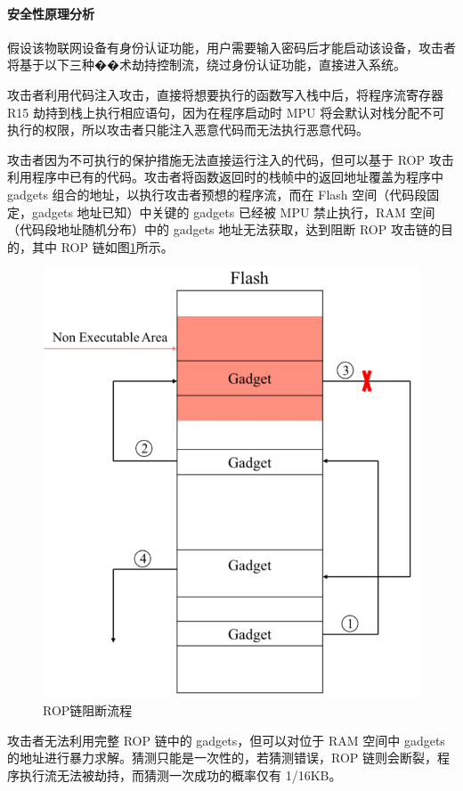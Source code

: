 \documentclass[12pt,a4paper]{ctexart}
\numberwithin{figure}{section}
\begin{document}
\paragraph{安全性原理分析}
\par 假设该物联网设备有身份认证功能，用户需要输入密码后才能启动该设备，攻击者将基于以下三种��术劫持控制流，绕过身份认证功能，直接进入系统。
\par 攻击者利用代码注入攻击，直接将想要执行的函数写入栈中后，将程序流寄存器R15 劫持到栈上执行相应语句，因为在程序启动时 MPU 将会默认对栈分配不可执行的权限，所以攻击者只能注入恶意代码而无法执行恶意代码。
\par 攻击者因为不可执行的保护措施无法直接运行注入的代码，但可以基于 ROP 攻击利用程序中已有的代码。攻击者将函数返回时的栈帧中的返回地址覆盖为程序中gadgets 组合的地址，以执行攻击者预想的程序流，而在 Flash 空间（代码段固定，gadgets 地址已知）中关键的 gadgets 已经被 MPU 禁止执行，RAM 空间（代码段地址随机分布）中的 gadgets 地址无法获取，达到阻断 ROP 攻击链的目的，其中 ROP 链如图\ref{ROP blocking process}所示。
\begin{figure}[H]
    \centering
    \includegraphics[scale=0.3]{graph/ROP blocking process.png}
    \caption{ROP链阻断流程}
    \label{ROP blocking process}
\end{figure}
\par 攻击者无法利用完整 ROP 链中的 gadgets，但可以对位于 RAM 空间中 gadgets 的地址进行暴力求解。猜测只能是一次性的，若猜测错误，ROP 链则会断裂，程序执行流无法被劫持，而猜测一次成功的概率仅有 1/16KB。
\end{document}
